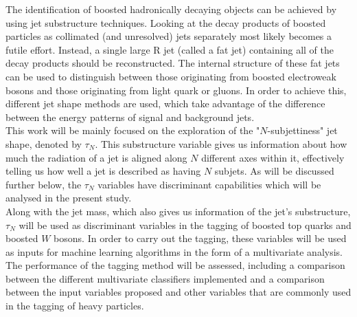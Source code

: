 \documentclass[main]{subfiles} %
\begin{document}
The identification of boosted hadronically decaying objects can be achieved by using jet substructure techniques. Looking at the decay products of boosted particles as collimated (and unresolved) jets separately most likely becomes a futile effort. Instead, a single large R jet (called a fat jet) containing all of the decay products should be reconstructed. The internal structure of these fat jets can be used to distinguish between those originating from boosted electroweak bosons and those originating from light quark or gluons. In order to achieve this, different jet shape methods are used, which take advantage of the difference between the energy patterns of signal and background jets. \\

This work will be mainly focused on the exploration of the "$N$-subjettiness" jet shape, denoted by $\tau_N$. This substructure variable gives us information about how much the radiation of a jet is aligned along $N$ different axes within it, effectively telling us how well a jet is described as having $N$ subjets. As will be discussed further below, the $\tau_N$ variables have discriminant capabilities which will be analysed in the present study. \\

Along with the jet mass, which also gives us information of the jet's substructure, $\tau_N$ will be used as discriminant variables in the tagging of boosted top quarks and boosted $W$ bosons. In order to carry out the tagging, these variables will be used as inputs for machine learning algorithms in the form of a multivariate analysis. The performance of the tagging method will be assessed, including a comparison between the different multivariate classifiers implemented and a comparison between the input variables proposed and other variables that are commonly used in the tagging of heavy particles. \\




















\biblio
\end{document}
